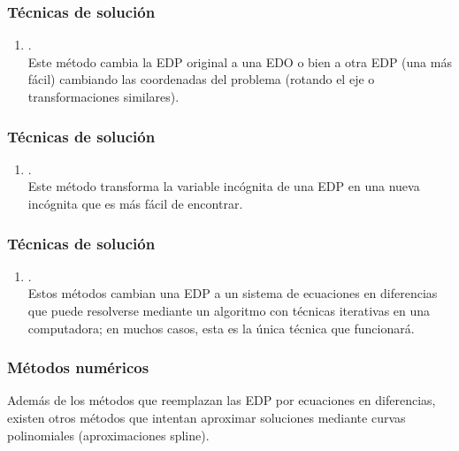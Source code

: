 \documentclass[12pt]{beamer}
\begin{document}
\begin{frame}
\frametitle{Técnicas de solución}
\begin{enumerate}
\conti
\item {}.
\\
\bigskip
Este método cambia la EDP original a una EDO o bien a otra EDP (una más fácil) cambiando las coordenadas del problema (rotando el eje o transformaciones similares).
\seti
\end{enumerate}
\end{frame}
\begin{frame}
\frametitle{Técnicas de solución}
\begin{enumerate}
\conti
\item {}.
\\
\bigskip
Este método transforma la variable incógnita de una EDP en una nueva incógnita que es más fácil de encontrar.
\seti
\end{enumerate}
\end{frame}
\begin{frame}
\frametitle{Técnicas de solución}
\begin{enumerate}
\conti
\item {}. 
\\
\bigskip
Estos métodos cambian una EDP a un sistema de ecuaciones en diferencias que puede resolverse mediante un algoritmo con técnicas iterativas en una computadora; en muchos casos, esta es la única técnica que funcionará. 
\seti
\end{enumerate}
\end{frame}
\begin{frame}
\frametitle{Métodos numéricos}
Además de los métodos que reemplazan las EDP por ecuaciones en diferencias, existen otros métodos que intentan aproximar soluciones mediante curvas polinomiales (aproximaciones spline).
\end{frame}
\end{document}
